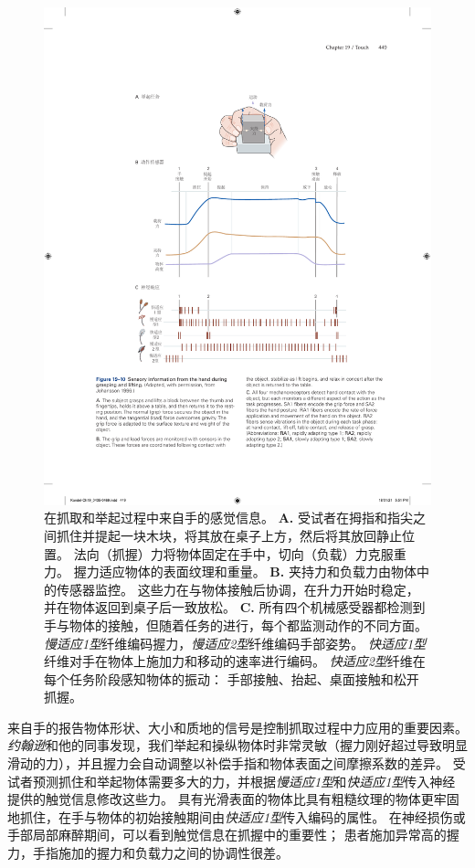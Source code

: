 \begin{figure}[htbp]
	\centering
	\includegraphics[width=1.0\linewidth]{chap19/fig_19_10}
	\caption{在抓取和举起过程中来自手的感觉信息\cite{johansson1996sensory}。
		\textbf{A.} 受试者在拇指和指尖之间抓住并提起一块木块，将其放在桌子上方，然后将其放回静止位置。
		法向（抓握）力将物体固定在手中，切向（负载）力克服重力。
		握力适应物体的表面纹理和重量。
		\textbf{B.} 夹持力和负载力由物体中的传感器监控。
		这些力在与物体接触后协调，在升力开始时稳定，并在物体返回到桌子后一致放松。
		\textbf{C.} 所有四个机械感受器都检测到手与物体的接触，但随着任务的进行，每个都监测动作的不同方面。
		\textit{慢适应1型}纤维编码握力，\textit{慢适应2型}纤维编码手部姿势。
		\textit{快适应1型}纤维对手在物体上施加力和移动的速率进行编码。
		\textit{快适应2型}纤维在每个任务阶段感知物体的振动：
		手部接触、抬起、桌面接触和松开抓握。}
	\label{fig:19_10}
\end{figure}


来自手的报告物体形状、大小和质地的信号是控制抓取过程中力应用的重要因素。
\textit{约翰逊}和他的同事发现，我们举起和操纵物体时非常灵敏（握力刚好超过导致明显滑动的力），并且握力会自动调整以补偿手指和物体表面之间摩擦系数的差异。
受试者预测抓住和举起物体需要多大的力，并根据\textit{慢适应1型}和\textit{快适应1型}传入神经提供的触觉信息修改这些力。
具有光滑表面的物体比具有粗糙纹理的物体更牢固地抓住，在手与物体的初始接触期间由\textit{快适应1型}传入编码的属性。
在神经损伤或手部局部麻醉期间，可以看到触觉信息在抓握中的重要性；
患者施加异常高的握力，手指施加的握力和负载力之间的协调性很差。


